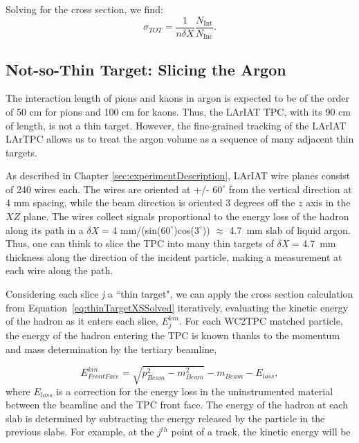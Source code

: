 Solving for the cross section, we find:
\begin{equation}
 \sigma_{TOT}  = \frac{1}{n \delta X}\frac{N_{\text{Int}}}{N_{\text{Inc}}}.
\label{eq:thinTargetXSSolved}
\end{equation}

\subsection{Not-so-Thin Target: Slicing the Argon}\label{ch:XSRaw}
The interaction length of pions and kaons in argon is expected to be of the order of 50 cm for pions and 100 cm for kaons. Thus, the LArIAT TPC, with its 90 cm of length, is not a thin target. However, the fine-grained tracking of the LArIAT LArTPC allows us to treat the argon volume as a sequence of many adjacent thin targets. 

As described in Chapter \ref{sec:experimentDescription}, LArIAT wire planes consist of 240 wires each. The wires are oriented at +/- $60^{\circ}$ from the vertical direction at 4 mm spacing, while the beam direction is oriented 3 degrees off the $z$ axis in the $XZ$ plane.  The wires collect signals proportional to the energy loss of the hadron along its path in a  $\delta${\emph{X}} = 4 mm/(sin($60^{\circ}$)cos($3^{\circ}$)) $\approx$ 4.7~mm slab of liquid argon. Thus, one can think to slice the TPC into many thin targets of $\delta${\emph{X}} = 4.7~mm thickness along the direction of the incident particle, making a measurement at each wire along the path.

Considering each slice {\emph{j}}  a ``thin target",  we can apply the cross section calculation from Equation~\ref{eq:thinTargetXSSolved} iteratively, evaluating the kinetic energy of the hadron as it enters each slice, $E_{j}^{kin}$.  For each WC2TPC matched particle, the energy of the hadron entering the TPC is known thanks to the momentum and mass determination by the tertiary beamline, 

\begin{equation}
 E^{kin}_{Front Face}  = \sqrt{p^2_{Beam} - m^2_{Beam}} - m_{Beam} - E_{loss},
\label{eq:enFF}
\end{equation}
where $E_{loss}$ is a correction for the energy loss in the uninstrumented material between the beamline and the TPC front face. The  energy of the hadron at each slab is determined by subtracting the energy released by the particle in the previous slabs. For example, at the $j^{th}$ point of a track, the kinetic energy will be

